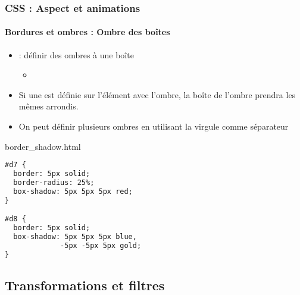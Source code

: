 \documentclass[xcolor=table]{beamer}
\begin{document}
\begin{frame}[fragile]
\frametitle{CSS : Aspect et animations}
\framesubtitle{Bordures et ombres : Ombre des boîtes}

\begin{minipage}{0.47\textwidth}
	\begin{itemize}
		\item {} : définir des ombres à une boîte 
		\begin{itemize}
			\item {} 
		\end{itemize}
		\item Si une  est définie sur l'élément avec l'ombre, la boîte de l'ombre prendra les mêmes arrondis.
		\item On peut définir plusieurs ombres en utilisant la virgule comme séparateur
	\end{itemize}
\end{minipage}
%
\begin{minipage}{0.52\textwidth}
\begin{exampleblock}{border\_shadow.html}
\lstset{escapeinside=**}
\scriptsize\bfseries\vspace{-6pt}
\begin{lstlisting}[language={html}]
#d7 {
  border: 5px solid;
  border-radius: 25%;
  box-shadow: 5px 5px 5px red;
}

#d8 {
  border: 5px solid;
  box-shadow: 5px 5px 5px blue, 
             -5px -5px 5px gold;
}
\end{lstlisting}\vspace{-6pt}
\end{exampleblock}
\end{minipage}
\end{frame}

\subsection{Transformations et filtres}
\end{document}
